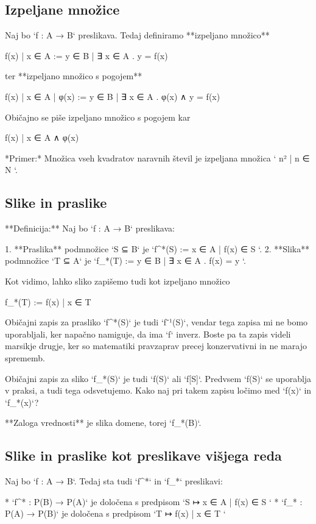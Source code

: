 \subsection{Izpeljane množice}

Naj bo `f : A → B` preslikava. Tedaj definiramo **izpeljano množico**

    { f(x) | x ∈ A } := { y ∈ B | ∃ x ∈ A . y = f(x) }

ter **izpeljano množico s pogojem**

    { f(x) | x ∈ A | φ(x) } := { y ∈ B | ∃ x ∈ A . φ(x) ∧ y = f(x) }

Običajno se piše izpeljano množico s pogojem kar

    { f(x) | x ∈ A ∧ φ(x) }

*Primer:* Množica vseh kvadratov naravnih števil je izpeljana množica `{ n² | n ∈ N }`.

\subsection{Slike in praslike}

**Definicija:** Naj bo `f : A → B` preslikava:

1. **Praslika** podmnožice `S ⊆ B` je `f^*(S) := { x ∈ A | f(x) ∈ S }`.
2. **Slika** podmnožice `T ⊆ A` je `f_*(T) := { y ∈ B | ∃ x ∈ A . f(x) = y }`.

Kot vidimo, lahko sliko zapišemo tudi kot izpeljano množico

    f_*(T) := { f(x) | x ∈ T }

Običajni zapis za prasliko `f^*(S)` je tudi `f⁻¹(S)`, vendar tega zapisa mi ne bomo uporabljali, ker napačno namiguje, da ima `f` inverz. Boste pa ta zapis videli marsikje drugje, ker so matematiki pravzaprav precej konzervativni in ne marajo sprememb.

Običajni zapis za sliko `f_*(S)` je tudi `f(S)` ali `f[S]`. Predvsem `f(S)` se uporablja v praksi, a tudi tega odsvetujemo. Kako naj pri takem zapisu ločimo med `f(x)` in `f_*({x})`?

**Zaloga vrednosti** je slika domene, torej `f_*(B)`.

\subsection{Slike in praslike kot preslikave višjega reda}

Naj bo `f : A → B`. Tedaj sta tudi `f^*` in `f_*` preslikavi:

* `f^* : P(B) → P(A)` je določena s predpisom `S ↦ { x ∈ A | f(x) ∈ S }`
* `f_* : P(A) → P(B)` je določena s predpisom `T ↦ { f(x) | x ∈ T }`

